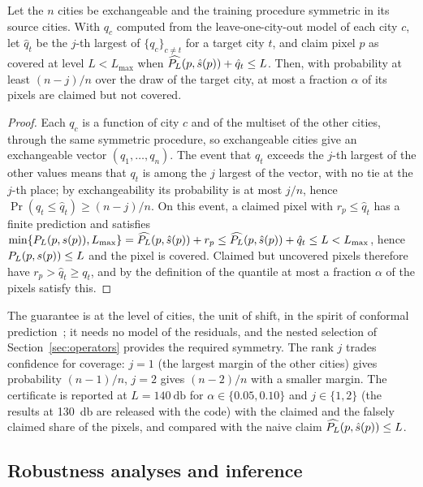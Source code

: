 \begin{proposition}
\label{prop:certify}
Let the $n$ cities be exchangeable and the training procedure symmetric in
its source cities. With $q_c$ computed from the leave-one-city-out model of
each city $c$, let $\hat q_t$ be the $j$-th largest of $\{q_c\}_{c\ne t}$ for
a target city $t$, and claim pixel $p$ as covered at level $L<L_{\max}$ when
$\widehat{P_{L}}(p,\hat s(p))+\hat q_t\le L$. Then, with probability at least
$(n-j)/n$ over the draw of the target city, at most a fraction $\alpha$ of
its pixels are claimed but not covered.
\end{proposition}
\begin{proof}
Each $q_c$ is a function of city $c$ and of the multiset of the other
cities, through the same symmetric procedure, so exchangeable cities give an
exchangeable vector $(q_1,\dots,q_n)$. The event that $q_t$ exceeds the
$j$-th largest of the other values means that $q_t$ is among the $j$ largest
of the vector, with no tie at the $j$-th place; by exchangeability its
probability is at most $j/n$, hence $\Pr(q_t\le\hat q_t)\ge(n-j)/n$. On this
event, a claimed pixel with $r_p\le\hat q_t$ has a finite prediction and
satisfies $\min\{P_{L}(p,s(p)),L_{\max}\}=\widehat{P_{L}}(p,\hat s(p))+r_p\le\widehat{P_{L}}(p,\hat s(p))+\hat q_t\le L<L_{\max}$,
hence $P_{L}(p,s(p))\le L$ and the pixel is covered. Claimed but uncovered
pixels therefore have $r_p>\hat q_t\ge q_t$, and by the definition of the
quantile at most a fraction $\alpha$ of the pixels satisfy this.
\end{proof}

\noindent The guarantee is at the level of cities, the unit of shift, in the
spirit of conformal prediction~\cite{vovk2005,barber2021}; it needs no model
of the residuals, and the nested selection of Section~\ref{sec:operators}
provides the required symmetry. The rank $j$ trades confidence for
coverage: $j=1$ (the largest margin of the other cities) gives probability
$(n-1)/n$, $j=2$ gives $(n-2)/n$ with a smaller margin. The certificate is
reported at $L=\SI{140}{\decibel}$ for $\alpha\in\{0.05,0.10\}$ and
$j\in\{1,2\}$ (the results at \SI{130}{\decibel} are released with the code)
with the claimed and the falsely claimed share of the pixels, and compared
with the naive claim $\widehat{P_{L}}(p,\hat s(p))\le L$.

\subsection{Robustness analyses and inference}
\label{sec:robust}

